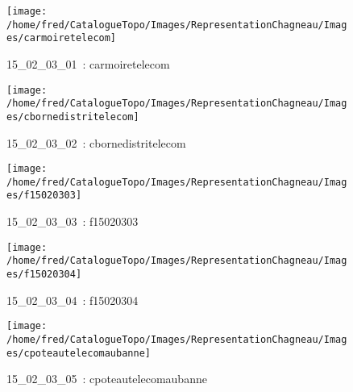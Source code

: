 \documentclass[12pt,titlepage]{book}
\begin{document}
\begin{figure}[h!]
  \hfill         %
  \begin{minipage}[t]{3cm}
    \begin{center}
      \texttt{[image: /home/fred/CatalogueTopo/Images/RepresentationChagneau/Images/carmoiretelecom]}
      \caption[~15\_02\_03\_01]{\small{15\_02\_03\_01~:} \tiny{carmoiretelecom}}\label{carmoiretelecom}
    \end{center}
  \end{minipage}
  \begin{minipage}[t]{3cm}
    \begin{center}
      \texttt{[image: /home/fred/CatalogueTopo/Images/RepresentationChagneau/Images/cbornedistritelecom]}
      \caption[~15\_02\_03\_02]{\small{15\_02\_03\_02~:} \tiny{cbornedistritelecom}}\label{cbornedistritelecom}
    \end{center}
  \end{minipage}
  \begin{minipage}[t]{3cm}
    \begin{center}
      \texttt{[image: /home/fred/CatalogueTopo/Images/RepresentationChagneau/Images/f15020303]}
      \caption[~15\_02\_03\_03]{\small{15\_02\_03\_03~:} \tiny{f15020303}}\label{f15020303}
    \end{center}
  \end{minipage}
  \begin{minipage}[t]{3cm}
    \begin{center}
      \texttt{[image: /home/fred/CatalogueTopo/Images/RepresentationChagneau/Images/f15020304]}
      \caption[~15\_02\_03\_04]{\small{15\_02\_03\_04~:} \tiny{f15020304}}\label{f15020304}
    \end{center}
  \end{minipage}
  \begin{minipage}[t]{3cm}
    \begin{center}
      \texttt{[image: /home/fred/CatalogueTopo/Images/RepresentationChagneau/Images/cpoteautelecomaubanne]}
      \caption[~15\_02\_03\_05]{\small{15\_02\_03\_05~:} \tiny{cpoteautelecomaubanne}}\label{cpoteautelecomaubanne}
    \end{center}
  \end{minipage}

\end{figure}
\end{document}
